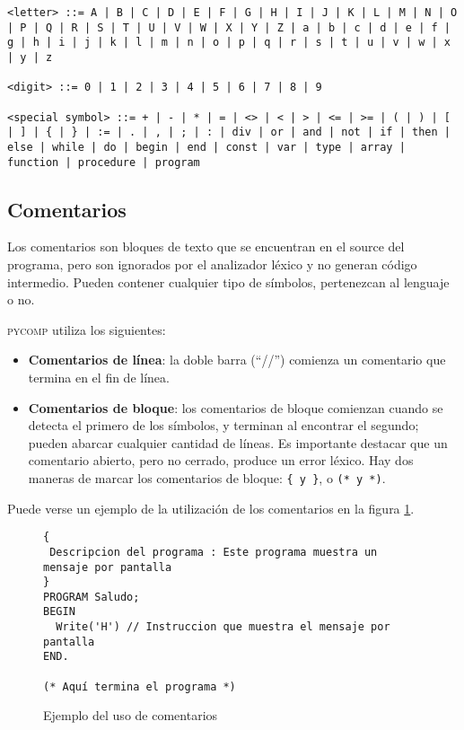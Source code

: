\documentclass[a4paper,oneside]{report}
\begin{document}
\begin{verbatim}
<letter> ::= A | B | C | D | E | F | G | H | I | J | K | L | M | N | O | P | Q | R | S | T | U | V | W | X | Y | Z | a | b | c | d | e | f | g | h | i | j | k | l | m | n | o | p | q | r | s | t | u | v | w | x | y | z

<digit> ::= 0 | 1 | 2 | 3 | 4 | 5 | 6 | 7 | 8 | 9

<special symbol> ::= + | - | * | = | <> | < | > | <= | >= | ( | ) | [ | ] | { | } | := | . | , | ; | : | div | or | and | not | if | then | else | while | do | begin | end | const | var | type | array | function | procedure | program
\end{verbatim}

\subsection{Comentarios}

Los comentarios son bloques de texto que se encuentran en el source del programa, pero son ignorados por el analizador léxico y no generan código intermedio. Pueden contener cualquier tipo de símbolos, pertenezcan al lenguaje o no.

\textsc{pycomp} utiliza los siguientes:

\begin{itemize}
	\item \textbf{Comentarios de línea}: la doble barra (``//'') comienza un comentario que termina en el fin de línea.
	\item \textbf{Comentarios de bloque}: los comentarios de bloque comienzan cuando se detecta el primero de los símbolos, y terminan al encontrar el segundo; pueden abarcar cualquier cantidad de líneas. Es importante destacar que un comentario abierto, pero no cerrado, produce un error léxico. Hay dos maneras de marcar los comentarios de bloque: \verb|{ y }|, o \verb|(* y *)|.
\end{itemize}

Puede verse un ejemplo de la utilización de los comentarios en la figura \ref{comentarios}.

\begin{figure}[h]
\begin{verbatim}
{ 
 Descripcion del programa : Este programa muestra un mensaje por pantalla
}
PROGRAM Saludo;
BEGIN
  Write('H') // Instruccion que muestra el mensaje por pantalla 
END.

(* Aquí termina el programa *)
\end{verbatim}
\caption{Ejemplo del uso de comentarios}
\label{comentarios}
\end{figure}
\end{document}
